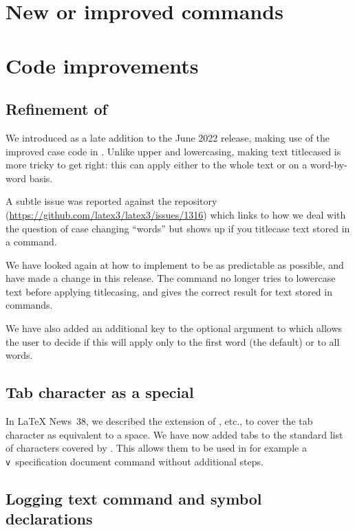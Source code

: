 \documentclass{ltnews}
\begin{document}
\section{New or improved commands}

\section{Code improvements}

\subsection{Refinement of }

We introduced  as a late addition to the June
2022 release, making use of the improved case code in
. Unlike upper and lowercasing, making text
titlecased is more tricky to get right: this can apply either to
the whole text or on a word-by-word basis.

A subtle issue was reported against the  repository
(\url{https://github.com/latex3/latex3/issues/1316}) which links
to how we deal with the question of case changing
\enquote{words} but shows up if you titlecase text stored in a
command.

We have looked again at how to implement  to
be as predictable as possible, and have made a change in this
release. The command no longer tries to lowercase text before
applying titlecasing, and gives the correct result for text
stored in commands.

We have also added an additional key to the optional argument to
 which allows the user to decide if this will
apply only to the first word (the default) or to all words.

\subsection{Tab character as a special}

In \LaTeX{} News~38, we described the extension of , etc., to cover
the tab character as equivalent to a space. We have now added tabs to the
standard list of characters covered by . This allows them to
be used in for example a \texttt{v}~specification document command without
additional steps.

\subsection{Logging text command and symbol declarations}
\end{document}
